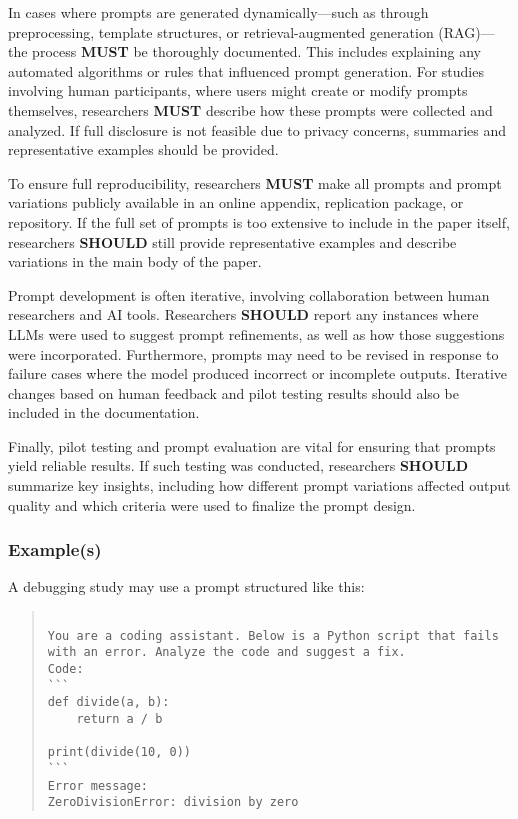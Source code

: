 \documentclass[11pt]{article}
\begin{document}
In cases where prompts are generated dynamically—such as through preprocessing, template structures, or retrieval-augmented generation (RAG)—the process \textbf{MUST} be thoroughly documented. This includes explaining any automated algorithms or rules that influenced prompt generation. For studies involving human participants, where users might create or modify prompts themselves, researchers \textbf{MUST} describe how these prompts were collected and analyzed. If full disclosure is not feasible due to privacy concerns, summaries and representative examples should be provided.

To ensure full reproducibility, researchers \textbf{MUST} make all prompts and prompt variations publicly available in an online appendix, replication package, or repository. If the full set of prompts is too extensive to include in the paper itself, researchers \textbf{SHOULD} still provide representative examples and describe variations in the main body of the paper.

Prompt development is often iterative, involving collaboration between human researchers and AI tools. Researchers \textbf{SHOULD} report any instances where LLMs were used to suggest prompt refinements, as well as how those suggestions were incorporated. Furthermore, prompts may need to be revised in response to failure cases where the model produced incorrect or incomplete outputs. Iterative changes based on human feedback and pilot testing results should also be included in the documentation.

Finally, pilot testing and prompt evaluation are vital for ensuring that prompts yield reliable results. If such testing was conducted, researchers \textbf{SHOULD} summarize key insights, including how different prompt variations affected output quality and which criteria were used to finalize the prompt design.

\subsubsection{Example(s)}
A debugging study may use a prompt structured like this:

\begin{quote}
\begin{verbatim}

You are a coding assistant. Below is a Python script that fails with an error. Analyze the code and suggest a fix.
Code:
```
def divide(a, b):
    return a / b

print(divide(10, 0))
```
Error message:
ZeroDivisionError: division by zero

\end{verbatim}
\end{quote}
\end{document}
